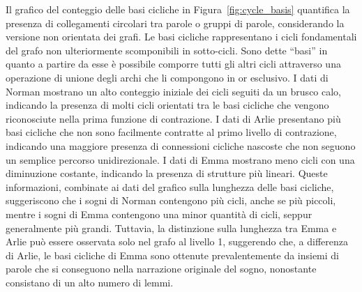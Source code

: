 Il grafico del conteggio delle basi cicliche in Figura~\ref{fig:cycle_basis} quantifica la presenza di collegamenti
circolari tra parole o gruppi di parole, considerando la versione non orientata dei grafi.
Le basi cicliche rappresentano i cicli fondamentali del grafo non ulteriormente scomponibili in sotto-cicli.
Sono dette ``basi'' in quanto a partire da esse è possibile comporre tutti gli altri cicli attraverso una operazione di
unione degli archi che li compongono in or esclusivo.
I dati di Norman mostrano un alto conteggio iniziale dei cicli seguiti da un brusco calo, indicando la presenza di molti
cicli orientati tra le basi cicliche che vengono riconosciute nella prima funzione di contrazione.
I dati di Arlie presentano più basi cicliche che non sono facilmente contratte al primo livello di contrazione,
indicando una maggiore presenza di connessioni cicliche nascoste che non seguono un semplice percorso unidirezionale.
I dati di Emma mostrano meno cicli con una diminuzione costante, indicando la presenza di strutture più lineari.
Queste informazioni, combinate ai dati del grafico sulla lunghezza delle basi cicliche, suggeriscono che i sogni di
Norman contengono più cicli, anche se più piccoli, mentre i sogni di Emma contengono una minor quantità di cicli,
seppur generalmente più grandi.
Tuttavia, la distinzione sulla lunghezza tra Emma e Arlie può essere osservata solo nel grafo al livello 1, suggerendo
che, a differenza di Arlie, le basi cicliche di Emma sono ottenute prevalentemente da insiemi di parole che si
conseguono nella narrazione originale del sogno, nonostante consistano di un alto numero di lemmi.


